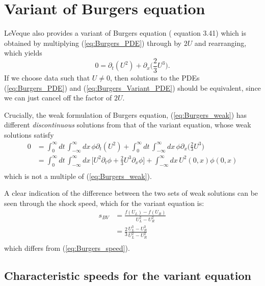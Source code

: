 \documentclass[12pt]{article}
\numberwithin{equation}{section}
\begin{document}
\section{Variant of Burgers equation}

LeVeque also provides a variant of Burgers equation (\cite{LeVeque92} equation
3.41) which is obtained by multiplying (\ref{eq:Burgers_PDE}) through by $2 U$
and rearranging, which yields
\begin{equation} \label{eq:Burgers_Variant_PDE}
0 = \partial_t (U^2) + \partial_x \Big( \frac{2}{3} U^3 \Big).
\end{equation}
If we choose data such that $U \neq 0$, then solutions to the PDEs
(\ref{eq:Burgers_PDE}) and (\ref{eq:Burgers_Variant_PDE}) should be equivalent,
since we can just cancel off the factor of $2 U$.

Crucially, the weak formulation of Burgers equation, (\ref{eq:Burgers_weak})
has different \textit{discontinuous} solutions from that of the variant
equation, whose weak solutions satisfy
\begin{equation}
\begin{aligned}
0 &= \int_{0}^{\infty} dt \, \int_{-\infty}^{\infty} dx \,
    \phi \partial_t (U^2) + \int_{0}^{\infty} dt \, \int_{-\infty}^{\infty} dx
    \, \phi \partial_x \Big( \frac{2}{3} U^3 \Big) \\
&= \int_{0}^{\infty} dt \, \int_{-\infty}^{\infty} dx \,
    \Big[ U^2 \partial_t \phi + \frac{2}{3} U^3 \partial_x \phi \Big]
    + \int_{-\infty}^{\infty} dx \, U^2(0, x) \phi(0, x) \\
\end{aligned}
\end{equation}
which is not a multiple of (\ref{eq:Burgers_weak}).

A clear indication of the difference between the two sets of weak solutions
can be seen through the shock speed, which for the variant equation is:
\begin{equation} \label{eq:Burgers_variant_speed}
\begin{aligned}
s_{BV} &= \frac{f(U_L) - f(U_R)}{U_L^2 - U_R^2} \\
&= \frac{2}{3} \frac{U_L^3 - U_R^3}{U_L^2 - U_R^2} \\
\end{aligned}
\end{equation}
which differs from (\ref{eq:Burgers_speed}).

\subsection{Characteristic speeds for the variant equation}
\end{document}
